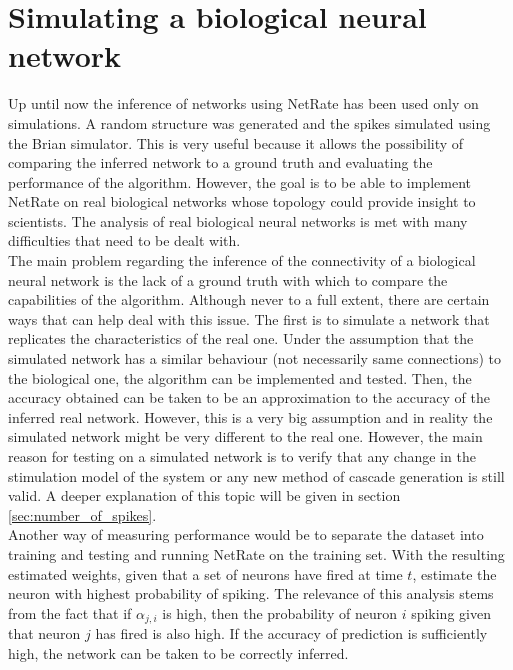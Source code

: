 
\chapter{Simulating a biological neural network}

Up until now the inference of networks using NetRate has been used only on simulations. A random structure was generated and the spikes simulated using the Brian simulator. This is very useful because it allows the possibility of comparing the inferred network to a ground truth and evaluating the performance of the algorithm. However, the goal is to be able to implement NetRate on real biological networks whose topology could provide insight to scientists. The analysis of real biological neural networks is met with many difficulties that need to be dealt with.\\

The main problem regarding the inference of the connectivity of a biological neural network is the lack of a ground truth with which to compare the capabilities of the algorithm. Although never to a full extent, there are certain ways that can help deal with this issue. The first is to simulate a network that replicates the characteristics of the real one. Under the assumption that the simulated network has a similar behaviour (not necessarily same connections) to the biological one, the algorithm can be implemented and tested. Then, the accuracy obtained can be taken to be an approximation to the accuracy of the inferred real network. However, this is a very big assumption and in reality the simulated network might be very different to the real one. However, the main reason for testing on a simulated network is to verify that any change in the stimulation model of the system or any new method of cascade generation is still valid. A deeper explanation of this topic will be given in section \ref{sec:number_of_spikes}.\\

Another way of measuring performance would be to separate the dataset into training and testing and running NetRate on the training set. With the resulting estimated weights, given that a set of neurons have fired at time \(t\), estimate the neuron with highest probability of spiking. The relevance of this analysis stems from the fact that if \(\alpha_{j,i}\) is high, then the probability of neuron \(i\) spiking given that neuron \(j\) has fired is also high. If the accuracy of prediction is sufficiently high, the network can be taken to be correctly inferred.\\

